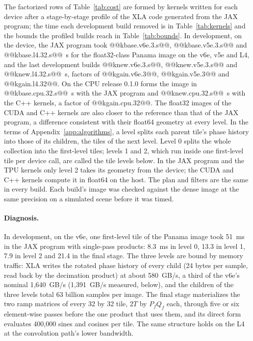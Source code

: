 \documentclass[11pt]{article}
\begin{document}
The factorized rows of Table~\ref{tab:cost} are formed by kernels written for each device after a stage-by-stage profile of the XLA code generated from the JAX program; the time each development build removed is in Table~\ref{tab:kernels} and the bounds the profiled builds reach in Table~\ref{tab:bounds}. In development, on the device, the JAX program took @@kbase.v6e.3.s@@, @@kbase.v5e.3.s@@ and @@kbase.l4.32.s@@~s for the float32-class Panama image on the v6e, v5e and L4, and the last development builds @@knew.v6e.3.s@@, @@knew.v5e.3.s@@ and @@knew.l4.32.s@@~s, factors of @@kgain.v6e.3@@, @@kgain.v5e.3@@ and @@kgain.l4.32@@. On the CPU release 0.1.0 forms the image in @@kbase.cpu.32.s@@~s with the JAX program and @@knew.cpu.32.s@@~s with the C++ kernels, a factor of @@kgain.cpu.32@@. The float32 images of the CUDA and C++ kernels are also closer to the reference than that of the JAX program, a difference consistent with their float64 geometry at every level. In the terms of Appendix~\ref{app:algorithms}, a level splits each parent tile's phase history into those of its children, the tiles of the next level. Level 0 splits the whole collection into the first-level tiles; levels 1 and 2, which run inside one first-level tile per device call, are called the tile levels below. In the JAX program and the TPU kernels only level 2 takes its geometry from the device; the CUDA and C++ kernels compute it in float64 on the host. The plan and filters are the same in every build. Each build's image was checked against the dense image at the same precision on a simulated scene before it was timed.

\paragraph{Diagnosis.} In development, on the v6e, one first-level tile of the Panama image took 51~ms in the JAX program with single-pass products: 8.3~ms in level 0, 13.3 in level 1, 7.9 in level 2 and 21.4 in the final stage. The three levels are bound by memory traffic: XLA writes the rotated phase history of every child (24 bytes per sample, read back by the decimation product) at about 580~GB/s, a third of the v6e's nominal 1,640~GB/s (1,391~GB/s measured, below), and the children of the three levels total 63 billion samples per image. The final stage materializes the two ramp matrices of every 32 by 32 tile, $2T$ by $P_f Q_f$ each, through five or six element-wise passes before the one product that uses them, and its direct form evaluates 400,000 sines and cosines per tile. The same structure holds on the L4 at the convolution path's lower bandwidth.
\end{document}

